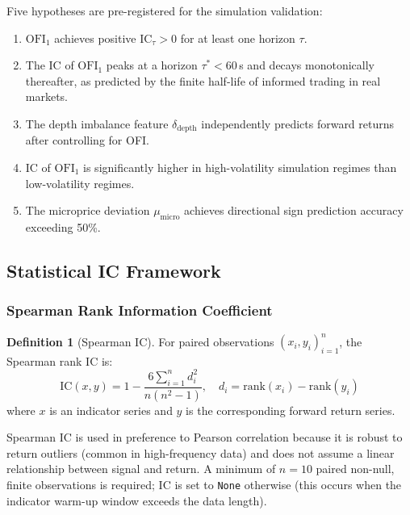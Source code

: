 \documentclass[12pt,a4paper]{article}
\theoremstyle{definition}
\newtheorem{definition}{Definition}[section]
\theoremstyle{remark}
\newcommand{\IC}{\mathrm{IC}}
\newcommand{\OFI}{\mathrm{OFI}}
\begin{document}
Five hypotheses are pre-registered for the simulation validation:
\begin{enumerate}
  \item[\textbf{H1}] $\OFI_1$ achieves positive IC$_\tau > 0$ for at
    least one horizon $\tau$.
  \item[\textbf{H2}] The IC of $\OFI_1$ peaks at a horizon
    $\tau^* < 60$\,s and decays monotonically thereafter, as predicted
    by the finite half-life of informed trading in real markets.
  \item[\textbf{H3}] The depth imbalance feature $\delta_\mathrm{depth}$
    independently predicts forward returns after controlling for OFI.
  \item[\textbf{H4}] IC of $\OFI_1$ is significantly higher in
    high-volatility simulation regimes than low-volatility regimes.
  \item[\textbf{H5}] The microprice deviation $\mu_\mathrm{micro}$
    achieves directional sign prediction accuracy exceeding 50\%.
\end{enumerate}

\subsection{Statistical IC Framework}
\label{sec:ic_methods}

\subsubsection{Spearman Rank Information Coefficient}

\begin{definition}[Spearman IC]
For paired observations $(x_i, y_i)_{i=1}^{n}$, the Spearman rank IC is:
\begin{equation}
  \IC(x, y) = 1 - \frac{6\displaystyle\sum_{i=1}^{n} d_i^2}{n(n^2-1)},
  \quad d_i = \mathrm{rank}(x_i) - \mathrm{rank}(y_i)
\label{eq:ic}
\end{equation}
where $x$ is an indicator series and $y$ is the corresponding forward
return series.
\end{definition}

Spearman IC is used in preference to Pearson correlation because it
is robust to return outliers (common in high-frequency data) and
does not assume a linear relationship between signal and return.
A minimum of $n=10$ paired non-null, finite observations is required;
IC is set to \texttt{None} otherwise (this occurs when the indicator
warm-up window exceeds the data length).
\end{document}

